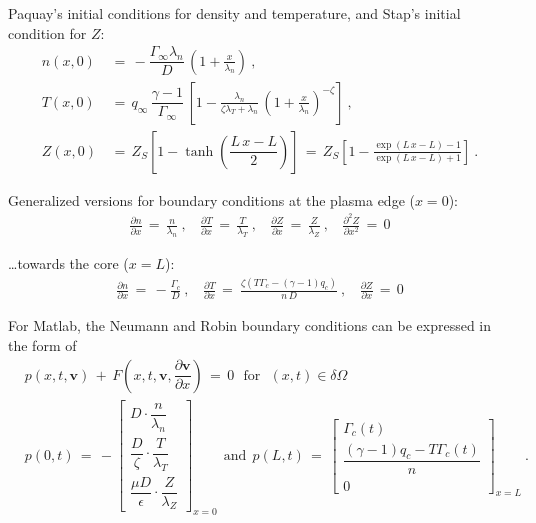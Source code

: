 \documentclass[a4paper,8pt]{article}
\begin{document}
Paquay's initial conditions for density and temperature, and Stap's
initial condition for \(Z\): \small\begin{align}
    n(x,0) \,&=\, -\dfrac{\Gamma_\infty \lambda_n}{D} \, \left(1 + \frac{x}{\lambda_n}\right)~, \\
    T(x,0) \,&=\, q_\infty \, \dfrac{\gamma - 1}{\Gamma_\infty} \, \left[1 - \frac{\lambda_n}{\zeta \lambda_T + \lambda_n} \, \left(1 + \frac{x}{\lambda_n}\right)^{-\zeta}\right]~, \\
    Z(x,0) \,&=\, Z_S\left[1 - \tanh\left(\dfrac{L\,x - L}{2}\right)\right] \,=\, Z_S\left[1 - \frac{\exp(L\,x - L) - 1}{\exp(L\,x - L) + 1}\right]~.
\end{align}\normalsize

Generalized versions for boundary conditions at the plasma edge
(\(x=0\)): \begin{align}
    \frac{\partial n}{\partial x} \,=\, \frac{n}{\lambda_n}~, ~~~~\frac{\partial T}{\partial x} \,=\, \frac{T}{\lambda_T}~, ~~~~\frac{\partial Z}{\partial x} \,=\, \frac{Z}{\lambda_Z}~,~~~~ \frac{\partial^2 Z}{\partial x^2} \,=\, 0
\end{align}

\ldots{}towards the core (\(x=L\)): \begin{align}
    \frac{\partial n}{\partial x} \,=\, -\frac{\Gamma_c}{D}~, ~~~~ \frac{\partial T}{\partial x} \,=\ \frac{\zeta\left(T \Gamma_c - (\gamma - 1) q_c\right)}{n\,D}~, ~~~~\frac{\partial Z}{\partial x} \,=\, 0
\end{align}

For Matlab, the Neumann and Robin boundary conditions can be expressed
in the form of \small\begin{align}
    &p\left(x, t, \mathbf{v}\right) \,+\, F\left(x, t, \mathbf{v}, \dfrac{\partial\mathbf{v}}{\partial x}\right) \,=\, 0 ~~~ \text{for} ~~~ (x, t) \in \delta\Omega \\
&p(0, t) \,=\, -\begin{bmatrix}
                D \cdot \dfrac{n}{\lambda_n}\\[2ex]
                \dfrac{D}{\zeta} \cdot \dfrac{T}{\lambda_T} \\[2ex]
                \dfrac{\mu D}{\epsilon} \cdot \dfrac{Z}{\lambda_Z}
                \end{bmatrix}_{x = 0}
~~ \text{and} ~~
p(L, t) \,=\, \begin{bmatrix}
                \Gamma_c(t) \\[1ex]
                \dfrac{(\gamma - 1) q_c - T\Gamma_c(t)}{n} \\[2ex]
                0
                \end{bmatrix}_{x=L}~.
\end{align}\normalsize
\end{document}
